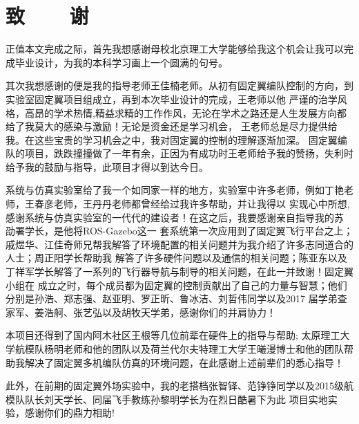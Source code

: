 %
%
%
%
%
%

\chapter*{\vskip 10bp \textmd{致~~~~谢} \vskip -6bp}

正值本文完成之际，首先我想感谢母校北京理工大学能够给我这个机会让我可以完成毕业设计，为我的本科学习画上一个圆满的句号。

其次我想感谢的便是我的指导老师王佳楠老师。从初有固定翼编队控制的方向，到实验室固定翼项目组成立，再到本次毕业设计的完成，王老师以他
严谨的治学风格，高昂的学术热情,精益求精的工作作风，无论在学术之路还是人生发展方向都给了我莫大的感染与激励！无论是资金还是学习机会，
王老师总是尽力提供给我。在这些宝贵的学习机会之中，我对固定翼的控制的理解逐渐加深。
固定翼编队的项目，跌跌撞撞做了一年有余，正因为有成功时王老师给予我的赞扬，失利时给予我的鼓励与指导，此项目才得以到达今日。

系统与仿真实验室给了我一个如同家一样的地方，实验室中许多老师，例如丁艳老师，王春彦老师，王丹丹老师都曾经给过我许多帮助，并让我得以
实现心中所想,感谢系统与仿真实验室的一代代的建设者！在这之后，我要感谢亲自指导我的苏 劭署学长，是他将ROS-Gazebo这一
套系统第一次应用到了固定翼飞行平台之上；戚煜华、江佳奇师兄帮我解答了环境配置的相关问题并为我介绍了许多志同道合的人士；周正阳学长帮助我
解答了许多硬件问题以及通信的相关问题；陈亚东以及丁祥军学长解答了一系列的飞行器导航与制导的相关问题，在此一并致谢！固定翼小组在
成立之时，每个成员都为固定翼的控制贡献出了自己的力量与智慧；他们分别是孙浩、郑志强、赵亚明、罗正昕、鲁冰洁、刘哲伟同学以及2017
届学弟查家军、姜浩舸、张艺弘以及胡牧天学弟，感谢你们的并肩协力！

本项目还得到了国内阿木社区王根等几位前辈在硬件上的指导与帮助; 太原理工大学航模队杨明老师和他的团队以及荷兰代尔夫特理工大学王曦漫博士和他的团队帮
助我解决了固定翼多机编队仿真的环境问题，在此感谢上述前辈们的悉心指导！

此外，在前期的固定翼外场实验中，我的老搭档张智铎、范铮铮同学以及2015级航模队队长刘天学长、同届飞手教练孙黎明学长为在烈日酷暑下为此
项目实地实验，感谢你们的鼎力相助!

